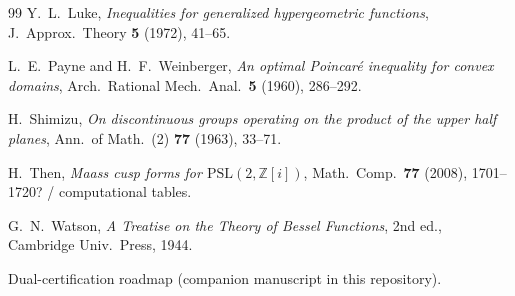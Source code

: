 \documentclass[11pt]{amsart}
\theoremstyle{definition}
\begin{document}
\begin{thebibliography}{99}
Y.~L.~Luke,
\emph{Inequalities for generalized hypergeometric functions},
J.\ Approx.\ Theory \textbf{5} (1972), 41--65.

L.~E.~Payne and H.~F.~Weinberger,
\emph{An optimal Poincar\'e inequality for convex domains},
Arch.\ Rational Mech.\ Anal.\ \textbf{5} (1960), 286--292.

H.~Shimizu,
\emph{On discontinuous groups operating on the product of the upper
half planes},
Ann.\ of Math.\ (2) \textbf{77} (1963), 33--71.

H.~Then,
\emph{Maass cusp forms for $\mathrm{PSL}(2,\mathbb{Z}[i])$},
Math.\ Comp.\ \textbf{77} (2008), 1701--1720? / computational tables.

G.~N.~Watson,
\emph{A Treatise on the Theory of Bessel Functions},
2nd ed., Cambridge Univ.\ Press, 1944.

Dual-certification roadmap (companion manuscript in this repository).

\end{thebibliography}
\end{document}
